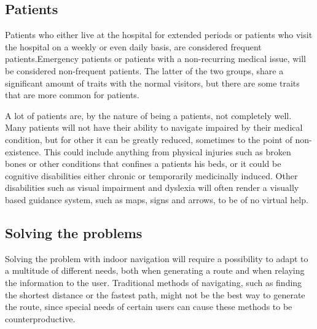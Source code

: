 
\subsection{Patients} %

Patients who either live at the hospital for extended periods or patients who visit the hospital on a weekly or even daily basis, are considered frequent patients.Emergency patients or patients with a non-recurring medical issue, will be considered non-frequent patients. The latter of the two groups, share a significant amount of traits with the normal visitors, but there are some traits that are more common for patients.

A lot of patients are, by the nature of being a patients, not completely well. Many patients will not have their ability to navigate impaired by their medical condition, but for other it can be greatly reduced, sometimes to the point of non-existence. This could include anything from physical injuries such as broken bones or other conditions that confines a patients his beds, or it could be cognitive disabilities either chronic or temporarily medicinally induced. Other disabilities such as visual impairment and dyslexia will often render a visually based guidance system, such as maps, signs and arrows, to be of no virtual help.


\subsection{Solving the problems}

Solving the problem with indoor navigation will require a possibility to adapt to a multitude of different needs, both when generating a route and when relaying the information to the user. Traditional methods of navigating, such as finding the shortest distance or the fastest path, might not be the best way to generate the route, since special needs of certain users can cause these methods to be counterproductive.


